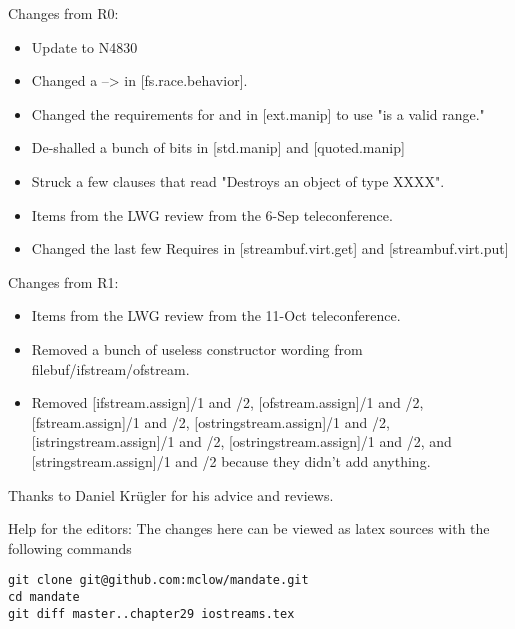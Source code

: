 Changes from R0:
\begin{itemize}
\item{Update to N4830}
\item{Changed a \requires --> \expects in [fs.race.behavior].}
\item{Changed the requirements for  and  in [ext.manip] to use "is a valid range."}
\item{De-shalled a bunch of bits in [std.manip] and [quoted.manip]}
\item{Struck a few clauses that read "Destroys an object of type XXXX".}
\item{Items from the LWG review from the 6-Sep teleconference.}
\item{Changed the last few Requires in [streambuf.virt.get] and [streambuf.virt.put]}
\end{itemize}

Changes from R1:
\begin{itemize}
\item{Items from the LWG review from the 11-Oct teleconference.}
\item{Removed a bunch of useless constructor wording from filebuf/ifstream/ofstream.}
\item{Removed [ifstream.assign]/1 and /2, [ofstream.assign]/1 and /2, [fstream.assign]/1 and /2, [ostringstream.assign]/1 and /2,  [istringstream.assign]/1 and /2, [ostringstream.assign]/1 and /2, and [stringstream.assign]/1 and /2 because they didn't add anything.}
\end{itemize}

Thanks to Daniel Krügler for his advice and reviews.

\vfill
Help for the editors: The changes here can be viewed as latex sources with the following commands
\begin{verbatim}
git clone git@github.com:mclow/mandate.git
cd mandate
git diff master..chapter29 iostreams.tex
\end{verbatim}
